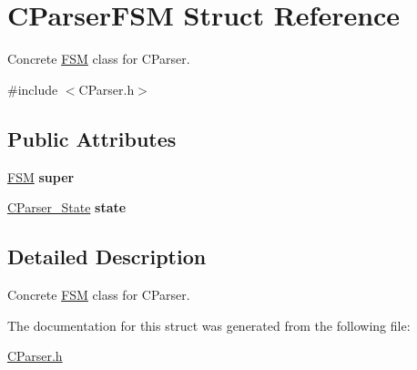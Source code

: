 \section{CParserFSM Struct Reference}
\label{struct_c_parser_f_s_m}


Concrete \hyperlink{struct_f_s_m}{FSM} class for CParser.  




{\ttfamily \#include $<$CParser.h$>$}

\subsection*{Public Attributes}
\begin{DoxyCompactItemize}
\item 
\hyperlink{struct_f_s_m}{FSM} {\bfseries super}\label{struct_c_parser_f_s_m_a45e7126d0bc3ef764699742852716355}

\item 
\hyperlink{group___c_parser_ga5ccffdf5b5411f5458cc65c8acce9cfa}{CParser\_\-State} {\bfseries state}\label{struct_c_parser_f_s_m_a3c27a9b4dc4d9a1b77c112f7b7d77a79}

\end{DoxyCompactItemize}


\subsection{Detailed Description}
Concrete \hyperlink{struct_f_s_m}{FSM} class for CParser. 

The documentation for this struct was generated from the following file:\begin{DoxyCompactItemize}
\item 
\hyperlink{_c_parser_8h}{CParser.h}\end{DoxyCompactItemize}
